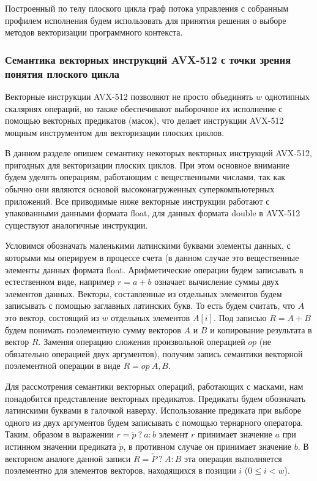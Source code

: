 Построенный по телу плоского цикла граф потока управления с собранным профилем исполнения будем использовать для принятия решения о выборе методов векторизации программного контекста.

\subsubsection{Семантика векторных инструкций AVX-512 с точки зрения понятия плоского цикла}

Векторные инструкции AVX-512 позволяют не просто объединять $w$ однотипных скалярнях операций, но также обеспечивают выборочное их исполнение с помощью векторных предикатов (масок), что делает инструкции AVX-512 мощным инструментом для векторизации плоских циклов.

В данном разделе опишем семантику некоторых векторных инструкций AVX-512, пригодных для векторизации плоских циклов.
При этом основное внимание будем уделять операциям, работающим с вещественными числами, так как обычно они являются основой высоконагруженных суперкомпьютерных приложений.
Все приводимые ниже векторные инструкции работают с упакованными данными формата float, для данных формата double в AVX-512 существуют аналогичные инструкции.

Условимся обозначать маленькими латинскими буквами элементы данных, с которыми мы оперируем в процессе счета (в данном случае это вещественные элементы данных формата float.
Арифметические операции будем записывать в естественном виде, например $r = a + b$ означает вычисление суммы двух элементов данных.
Векторы, составленные из отдельных элементов будем записывать с помощью заглавных латинских букв.
То есть будем считать, что $A$ это вектор, состоящий из $w$ отдельных элементов $A[i]$.
Под записью $R = A + B$ будем понимать поэлементную сумму векторов $A$ и $B$ и копирование результата в вектор $R$.
Заменяя операцию сложения произвольной операцией $op$ (не обязательно операцией двух аргументов), получим запись семантики векторной поэлементной операции в виде $R = op \ A, B$.

Для рассмотрения семантики векторных операций, работающих с масками, нам понадобится представление векторных предикатов.
Предикаты будем обозначать латинскими буквами в галочкой наверху.
Использование предиката при выборе одного из двух аргументов будем записывать с помощью тернарного оператора.
Таким, образом в выражении $r = \check{p} \ ? \ a : b$ элемент $r$ принимает значение $a$ при истинном значении предиката $\check{p}$, в противном случае он принимает значение $b$.
В векторном аналоге данной записи $R = \check{P} \ ? \ A : B$ эта операция выполняется поэлементно для элементов векторов, находящихся в позиции $i$ ($0 \le i < w$).

